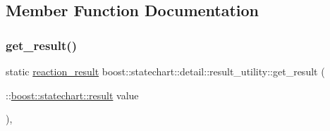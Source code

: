 \subsection{Member Function Documentation}
\mbox{\label{structboost_1_1statechart_1_1detail_1_1result__utility_ab782ed3d4fb9a27313f8f431d8bde936}} 
\subsubsection{\texorpdfstring{get\+\_\+result()}{get\_result()}}
{\footnotesize\ttfamily static \mbox{\hyperlink{namespaceboost_1_1statechart_1_1detail_ab091bbb4c29327fb46ee479ea1b7255b}{reaction\+\_\+result}} boost\+::statechart\+::detail\+::result\+\_\+utility\+::get\+\_\+result (\begin{DoxyParamCaption}\item[{\+::\mbox{\hyperlink{namespaceboost_1_1statechart_abe807f6598b614d6d87bb951ecd92331}{boost\+::statechart\+::result}}}]{value }\end{DoxyParamCaption})\hspace{0.3cm}{\ttfamily [inline]}, {\ttfamily [static]}}

